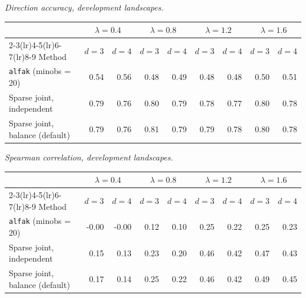 \par\medskip\noindent\begin{minipage}{\linewidth}
\textit{Direction accuracy, development landscapes.}
\begin{center}
\footnotesize
\setlength{\tabcolsep}{3.5pt}
\begin{tabular}{l*{8}{r}}
\toprule
 & \multicolumn{2}{c}{$\lambda=0.4$} & \multicolumn{2}{c}{$\lambda=0.8$} & \multicolumn{2}{c}{$\lambda=1.2$} & \multicolumn{2}{c}{$\lambda=1.6$} \\
\cmidrule(lr){2-3}\cmidrule(lr){4-5}\cmidrule(lr){6-7}\cmidrule(lr){8-9}
Method & $d=3$ & $d=4$ & $d=3$ & $d=4$ & $d=3$ & $d=4$ & $d=3$ & $d=4$ \\
\midrule
\texttt{alfak} (minobs = 20) & 0.54 & 0.56 & 0.48 & 0.49 & 0.48 & 0.48 & 0.50 & 0.51 \\
Sparse joint, independent & 0.79 & 0.76 & 0.80 & 0.79 & 0.78 & 0.77 & 0.80 & 0.78 \\
Sparse joint, balance (default) & 0.79 & 0.76 & 0.81 & 0.79 & 0.79 & 0.78 & 0.80 & 0.78 \\
\bottomrule
\end{tabular}
\end{center}
\end{minipage}

\par\medskip\noindent\begin{minipage}{\linewidth}
\textit{Spearman correlation, development landscapes.}
\begin{center}
\footnotesize
\setlength{\tabcolsep}{3.5pt}
\begin{tabular}{l*{8}{r}}
\toprule
 & \multicolumn{2}{c}{$\lambda=0.4$} & \multicolumn{2}{c}{$\lambda=0.8$} & \multicolumn{2}{c}{$\lambda=1.2$} & \multicolumn{2}{c}{$\lambda=1.6$} \\
\cmidrule(lr){2-3}\cmidrule(lr){4-5}\cmidrule(lr){6-7}\cmidrule(lr){8-9}
Method & $d=3$ & $d=4$ & $d=3$ & $d=4$ & $d=3$ & $d=4$ & $d=3$ & $d=4$ \\
\midrule
\texttt{alfak} (minobs = 20) & -0.00 & -0.00 & 0.12 & 0.10 & 0.25 & 0.22 & 0.25 & 0.23 \\
Sparse joint, independent & 0.15 & 0.13 & 0.23 & 0.20 & 0.46 & 0.42 & 0.47 & 0.43 \\
Sparse joint, balance (default) & 0.17 & 0.14 & 0.25 & 0.22 & 0.46 & 0.42 & 0.49 & 0.45 \\
\bottomrule
\end{tabular}
\end{center}
\end{minipage}

